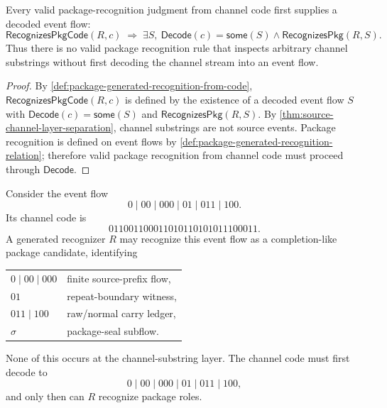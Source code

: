 \begin{proposition}
\label{prop:package-generated-no-recognition-by-channel-substring}
Every valid package-recognition judgment from channel code first supplies a decoded event flow:
$$
  \mathsf{RecognizesPkgCode}(R,c)
  \;\Longrightarrow\;
  \exists S,\ \mathsf{Decode}(c)=\mathsf{some}(S)
  \wedge
  \mathsf{RecognizesPkg}(R,S).
$$
Thus there is no valid package recognition rule that inspects arbitrary channel substrings without first decoding the channel stream into an event flow.
\end{proposition}

\begin{proof}
By \autoref{def:package-generated-recognition-from-code}, $\mathsf{RecognizesPkgCode}(R,c)$ is defined by the existence of a decoded event flow $S$ with $\mathsf{Decode}(c)=\mathsf{some}(S)$ and $\mathsf{RecognizesPkg}(R,S)$. By \autoref{thm:source-channel-layer-separation}, channel substrings are not source events. Package recognition is defined on event flows by \autoref{def:package-generated-recognition-relation}; therefore valid package recognition from channel code must proceed through $\mathsf{Decode}$.
\end{proof}

\begin{example}
\label{ex:package-generated-completion-skeleton}
Consider the event flow
$$
  0 \mid 00 \mid 000 \mid 01 \mid 011 \mid 100.
$$
Its channel code is
$$
  011001100011010110101011100011.
$$
A generated recognizer $R$ may recognize this event flow as a completion-like package candidate, identifying
\begin{center}
\begin{tabular}{ll}
  $0 \mid 00 \mid 000$ & finite source-prefix flow, \\
  $01$                & repeat-boundary witness, \\
  $011 \mid 100$      & raw/normal carry ledger, \\
  $\sigma$            & package-seal subflow.
\end{tabular}
\end{center}
None of this occurs at the channel-substring layer. The channel code must first decode to
$$
  0 \mid 00 \mid 000 \mid 01 \mid 011 \mid 100,
$$
and only then can $R$ recognize package roles.
\end{example}

